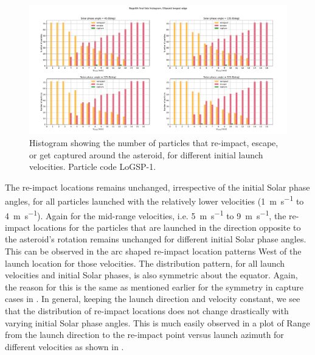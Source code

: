 \begin{figure}[htb]
\centering
\captionsetup{justification=centering}
\includegraphics[angle=90, width=\textwidth, height=\textheight, keepaspectratio=true]{longest_edge_perturbations/3.2Density_1cmSize/final_fate_versus_launch_velocity_histogram_all_solar_phases.pdf}
\caption{Histogram showing the number of particles that re-impact, escape, or get captured around the asteroid, for different initial launch velocities. Particle code LoGSP-1.}
\label{fig:LoGSP_1_final_fate_histogram}
\end{figure}
\FloatBarrier
The re-impact locations remains unchanged, irrespective of the initial Solar phase angles, for all particles launched with the relatively lower velocities (\SI{1}{\metre\per\second} to \SI{4}{\metre\per\second}). Again for the mid-range velocities, i.e. \SI{5}{\metre\per\second} to \SI{9}{\metre\per\second}, the re-impact locations for the particles that are launched in the direction opposite to the asteroid's rotation remains unchanged for different initial Solar phase angles. This can be observed in the arc shaped re-impact location patterns West of the launch location for those velocities. The distribution pattern, for all launch velocities and initial Solar phases, is also symmetric about the equator. Again, the reason for this is the same as mentioned earlier for the symmetry in capture cases in . In general, keeping the launch direction and velocity constant, we see that the distribution of re-impact locations does not change drastically with varying initial Solar phase angles. This is much easily observed in a plot of Range from the launch direction to the re-impact point versus launch azimuth for different velocities as shown in .
%
\newline\newline
%

